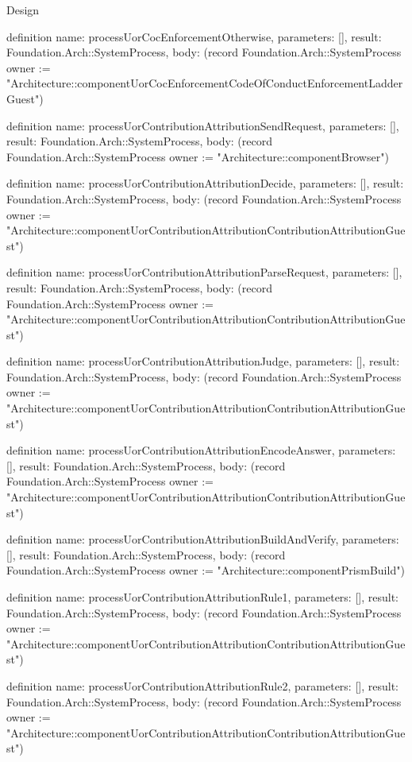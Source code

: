 \begin{lexlean}{Design}
\begin{semanticmodule}
definition{
  name: processUorCocEnforcementOtherwise,
  parameters: [],
  result: Foundation.Arch::SystemProcess,
  body: (record Foundation.Arch::SystemProcess {owner := "Architecture::componentUorCocEnforcementCodeOfConductEnforcementLadderGuest"})
}

definition{
  name: processUorContributionAttributionSendRequest,
  parameters: [],
  result: Foundation.Arch::SystemProcess,
  body: (record Foundation.Arch::SystemProcess {owner := "Architecture::componentBrowser"})
}

definition{
  name: processUorContributionAttributionDecide,
  parameters: [],
  result: Foundation.Arch::SystemProcess,
  body: (record Foundation.Arch::SystemProcess {owner := "Architecture::componentUorContributionAttributionContributionAttributionGuest"})
}

definition{
  name: processUorContributionAttributionParseRequest,
  parameters: [],
  result: Foundation.Arch::SystemProcess,
  body: (record Foundation.Arch::SystemProcess {owner := "Architecture::componentUorContributionAttributionContributionAttributionGuest"})
}

definition{
  name: processUorContributionAttributionJudge,
  parameters: [],
  result: Foundation.Arch::SystemProcess,
  body: (record Foundation.Arch::SystemProcess {owner := "Architecture::componentUorContributionAttributionContributionAttributionGuest"})
}

definition{
  name: processUorContributionAttributionEncodeAnswer,
  parameters: [],
  result: Foundation.Arch::SystemProcess,
  body: (record Foundation.Arch::SystemProcess {owner := "Architecture::componentUorContributionAttributionContributionAttributionGuest"})
}

definition{
  name: processUorContributionAttributionBuildAndVerify,
  parameters: [],
  result: Foundation.Arch::SystemProcess,
  body: (record Foundation.Arch::SystemProcess {owner := "Architecture::componentPrismBuild"})
}

definition{
  name: processUorContributionAttributionRule1,
  parameters: [],
  result: Foundation.Arch::SystemProcess,
  body: (record Foundation.Arch::SystemProcess {owner := "Architecture::componentUorContributionAttributionContributionAttributionGuest"})
}

definition{
  name: processUorContributionAttributionRule2,
  parameters: [],
  result: Foundation.Arch::SystemProcess,
  body: (record Foundation.Arch::SystemProcess {owner := "Architecture::componentUorContributionAttributionContributionAttributionGuest"})
}


\end{semanticmodule}
\end{lexlean}
